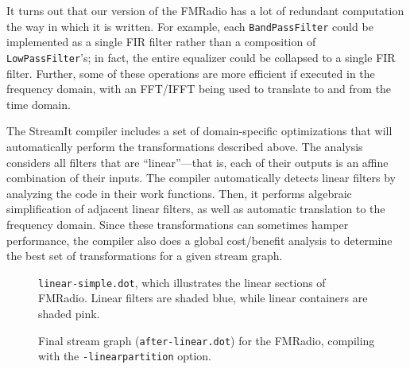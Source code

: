   It turns out that our
version of the FMRadio has a lot of redundant computation the way in
which it is written.  For example, each {\tt BandPassFilter} could be
implemented as a single FIR filter rather than a composition of {\tt
LowPassFilter}'s; in fact, the entire equalizer could be collapsed to
a single FIR filter.  Further, some of these operations are more
efficient if executed in the frequency domain, with an FFT/IFFT being
used to translate to and from the time domain.

The StreamIt compiler includes a set of domain-specific optimizations
that will automatically perform the transformations described above.
The analysis considers all filters that are ``linear''---that is, each
of their outputs is an affine combination of their inputs.  The
compiler automatically detects linear filters by analyzing the code in
their work functions.  Then, it performs algebraic simplification of
adjacent linear filters, as well as automatic translation to the
frequency domain.  Since these transformations can sometimes hamper
performance, the compiler also does a global cost/benefit analysis to
determine the best set of transformations for a given stream graph.

\begin{figure}[t]
\hspace{3pt} 
\caption{{\tt linear-simple.dot}, which illustrates the linear sections of FMRadio.  Linear filters are shaded blue, while linear containers are shaded pink.\protect\label{fig:fm-linear-simple}}
\end{figure}

\begin{figure}[t]
\vspace{-6pt}
\begin{center}
\hspace{0pt}
\vspace{-6pt}
\caption{Final stream graph ({\tt after-linear.dot}) for the FMRadio, compiling with the {\tt -linearpartition} option.\protect\label{fig:fm-after-linear}}
\end{center}
\vspace{-14pt}
\end{figure}

